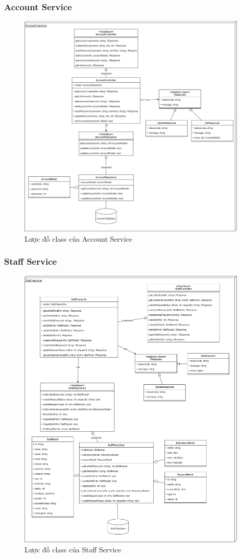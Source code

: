 \subsubsection{Account Service}
\begin{figure}[!htp]
	\centering
	\includegraphics[width=11cm]{img/Architecture/service/AccountService.png}
	\newline
	\caption{Lược đồ class của Account Service}
\end{figure}



\subsubsection{Staff Service}
\begin{figure}[!htp]
	\centering
	\includegraphics[width=11cm]{img/Architecture/service/StaffService.png}
	\newline
	\caption{Lược đồ class của Staff Service}
\end{figure}



